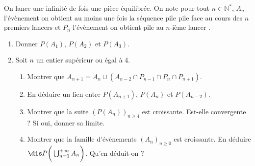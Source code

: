 \documentclass[a4paper,10pt]{report}
\begin{document}
\begin{Exercice}{} On lance une infinité de fois une pièce équilibrée. On note pour tout $n \in \mathbb{N}^*$, $A_n$ l'évènement \og on obtient au moins une fois la séquence pile pile face au cours des $n$ premiers lancers \fg et $P_n$  l'évènement \og on obtient pile au $n$-ième lancer \fg .

\begin{enumerate}
\item Donner $P(A_1)$, $P(A_2)$ et $P(A_3)$.
\item Soit $n$ un entier supérieur ou égal à 4.
\begin{enumerate}
\item Montrer que $A_{n+1} = A_n  \cup (\overline{A_{n-2}} \cap P_{n-1} \cap P_n \cap \overline{P_{n+1}})$.
\item En déduire un lien entre $P(A_{n+1})$, $P(A_n)$ et $P(A_{n-2})$. 
\item Montrer que la suite $(P(A_n))_{n \geq 4}$ est croissante. Est-elle convergente ? Si oui, donner sa limite.
\item Montrer que la famille d'évènements $(A_n)_{n \geq 0}$ est croissante. En déduire $\dis P \bigg{(} \bigcup_{n=1}^{+  \infty} A_n \bigg{)}$. Qu'en déduit-on ?
\end{enumerate}
\end{enumerate}
\end{Exercice}

\corr 
\end{document}
